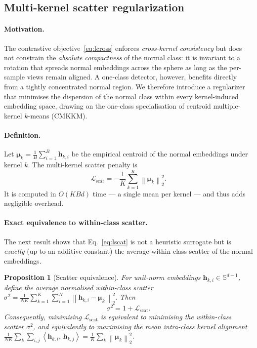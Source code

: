 \documentclass[times, review, 10pt]{elsarticle}
\newtheorem{proposition}{Proposition}
\newcommand{\Sph}{\mathbb{S}}
\newcommand{\norm}[1]{\left\lVert #1 \right\rVert}
\newcommand{\inner}[2]{\left\langle #1,\, #2 \right\rangle}
\newcommand{\Lscat}{\mathcal{L}_{\mathrm{scat}}}
\newcommand{\hh}{\bm{h}}
\newcommand{\mmu}{\bm{\mu}}
\begin{document}
\subsection{Multi-kernel scatter regularization}
\label{subsec:scatter}

\paragraph{Motivation.}
The contrastive objective~\eqref{eq:lcross} enforces \emph{cross-kernel
consistency} but does not constrain the \emph{absolute compactness} of the
normal class: it is invariant to a rotation that spreads normal embeddings
across the sphere as long as the per-sample views remain aligned. A one-class
detector, however, benefits directly from a tightly concentrated normal region.
We therefore introduce a regularizer that minimises the dispersion of the normal
class within every kernel-induced embedding space, drawing on the one-class
specialisation of centroid multiple-kernel $k$-means (CMKKM).

\paragraph{Definition.}
Let $\mmu_k=\frac{1}{B}\sum_{i=1}^{B}\hh_{k,i}$ be the empirical centroid of the
normal embeddings under kernel $k$. The multi-kernel scatter penalty is
\begin{equation}
\Lscat
=-\frac{1}{K}\sum_{k=1}^{K}\norm{\mmu_k}_2^{2}.
\label{eq:lscat}
\end{equation}
It is computed in $O(KBd)$ time --- a single mean per kernel --- and thus adds
negligible overhead.

\paragraph{Exact equivalence to within-class scatter.}
The next result shows that Eq.~\eqref{eq:lscat} is not a heuristic surrogate but
is \emph{exactly} (up to an additive constant) the average within-class scatter
of the normal embeddings.

\begin{proposition}[Scatter equivalence]
\label{prop:scatter}
For unit-norm embeddings $\hh_{k,i}\in\Sph^{d-1}$, define the average normalised
within-class scatter
$\sigma^2=\frac{1}{NK}\sum_{k=1}^{K}\sum_{i=1}^{N}\norm{\hh_{k,i}-\mmu_k}_2^{2}$.
Then
\begin{equation}
\sigma^2 = 1 + \Lscat .
\label{eq:equiv}
\end{equation}
Consequently, minimising $\Lscat$ is equivalent to minimising the within-class
scatter $\sigma^2$, and equivalently to maximising the mean intra-class kernel
alignment $\frac{1}{NK}\sum_k\sum_{i,j}\inner{\hh_{k,i}}{\hh_{k,j}}
=\frac{1}{K}\sum_k\norm{\mmu_k}_2^2$.
\end{proposition}
\end{document}

